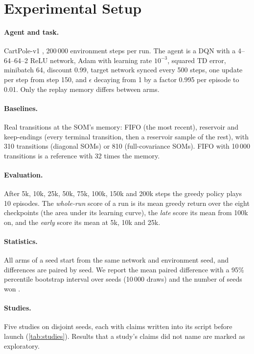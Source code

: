 \documentclass{article}
\begin{document}
\section{Experimental Setup}
\label{sec:setup}

\paragraph{Agent and task.} CartPole-v1 \citep{barto1983neuronlike,towers2024gymnasium},
200\,000 environment steps per run. The agent is a DQN with a 4--64--64--2
ReLU network, Adam \citep{kingma2015adam} with learning rate $10^{-3}$,
squared TD error, minibatch 64, discount 0.99, target network synced every
500 steps, one update per step from step 150, and $\epsilon$ decaying from 1
by a factor 0.995 per episode to 0.01. Only the replay memory differs between
arms.

\paragraph{Baselines.} Real transitions at the SOM's memory: FIFO (the most
recent), reservoir \citep[a uniform sample of everything seen;][]{vitter1985random}
and keep-endings (every terminal transition, then a reservoir sample of the
rest), with 310 transitions (diagonal SOMs) or 810 (full-covariance SOMs).
FIFO with 10\,000 transitions is a reference with 32 times the memory.

\paragraph{Evaluation.} After 5k, 10k, 25k, 50k, 75k, 100k, 150k and 200k
steps the greedy policy plays 10 episodes. The \emph{whole-run} score of a
run is its mean greedy return over the eight checkpoints (the area under its
learning curve), the \emph{late} score its mean from 100k on, and the
\emph{early} score its mean at 5k, 10k and 25k.

\paragraph{Statistics.} All arms of a seed start from the same network and
environment seed, and differences are paired by seed. We report the mean
paired difference with a 95\% percentile bootstrap interval over seeds
(10\,000 draws) and the number of seeds won
\citep{henderson2018deep,agarwal2021deep}.

\paragraph{Studies.} Five studies on disjoint seeds, each with claims
written into its script before launch (\cref{tab:studies}). Results that a
study's claims did not name are marked as exploratory.
\end{document}
